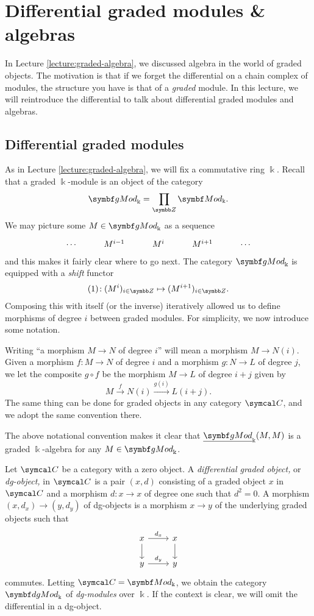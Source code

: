 
\section{Differential graded modules \& algebras}\label{lecture:dg-algebra}
In Lecture \ref{lecture:graded-algebra}, we discussed algebra in the world of graded objects. The motivation is that if we forget the differential on a
chain complex of modules, the structure you have is that of a \emph{graded} module. In this lecture, we will reintroduce the differential to talk about
differential graded modules and algebras.

\subsection{Differential graded modules}
As in Lecture \ref{lecture:graded-algebra}, we will fix a commutative ring \(\Bbbk\). Recall that a graded \(\Bbbk\)-module is an object of the category
\[ \gMod_\Bbbk = \prod_{\Z}\Mod_\Bbbk. \]
We may picture some \(M\in\gMod_\Bbbk\) as a sequence
\[
	\begin{tikzcd}
		\cdots & M^{i-1} & M^i & M^{i+1} & \cdots
	\end{tikzcd}
\]
and this makes it fairly clear where to go next. The category \(\gMod_\Bbbk\) is equipped with a \emph{shift} functor
\[ (1)\!: (M^i)_{i\in\Z}\mapsto (M^{i+1})_{i\in\Z}. \]
Composing this with itself (or the inverse) iteratively allowed us to define morphisms of degree \(i\) between graded modules.
For simplicity, we now introduce some notation.
\begin{notation}
	Writing ``a morphism \(M\to N\) of degree \(i\)'' will mean a morphism \(M\to N(i)\). Given a morphism \(f\!:M\to N\) of degree
	\(i\) and a morphism \(g\!:N\to L\) of degree \(j\), we let the composite \(g\circ f\) be the morphism \(M\to L\) of degree \(i+j\) given by
	\[ M \overset{f}\to N(i) \overset{g(i)}\to L(i+j). \]
	The same thing can be done for graded objects in any category \(\calC\), and we adopt the same convention there.
\end{notation}
\begin{remark}
	The above notational convention makes it clear that \(\ugMod_\Bbbk(M,M)\) is a graded \(\Bbbk\)-algebra for any \(M\in\gMod_\Bbbk\).
\end{remark}
\begin{definition}
	Let \(\calC\) be a category with a zero object. A \emph{differential graded object,} or \emph{dg-object,} in \(\calC\) is a pair \((x,d)\) consisting of a graded object \(x\) in \(\calC\)
	and a morphism \(d\!:x\to x\) of degree one such that \(d^2 = 0\). A morphism \((x,d_x)\to (y,d_y)\) of dg-objects is a morphism \(x\to y\)
	of the underlying graded objects such that
	\[
	\begin{tikzcd}
		x \ar[r,"d_x"]\ar[d] & x\ar[d] \\
		y \ar[r,"d_y"] & y
	\end{tikzcd}
	\]
	commutes. Letting \(\calC = \Mod_\Bbbk\), we obtain the category \(\dgMod_\Bbbk\) of \emph{dg-modules} over \(\Bbbk\). If the context is clear,
	we will omit the differential in a dg-object.
\end{definition}
